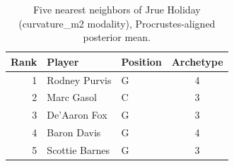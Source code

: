\begin{table}[htbp]
  \centering\small
  \begin{tabular}{rllc}
    \toprule
    Rank & Player & Position & Archetype \\
    \midrule
    1 & Rodney Purvis & G & 4 \\
    2 & Marc Gasol & C & 3 \\
    3 & De'Aaron Fox & G & 3 \\
    4 & Baron Davis & G & 4 \\
    5 & Scottie Barnes & G & 3 \\
    \bottomrule
  \end{tabular}
  \caption{Five nearest neighbors of Jrue Holiday (curvature_m2 modality), Procrustes-aligned posterior mean.}
  \label{tab:Jrue_Holiday_neighbors_curvature_m2}
\end{table}

